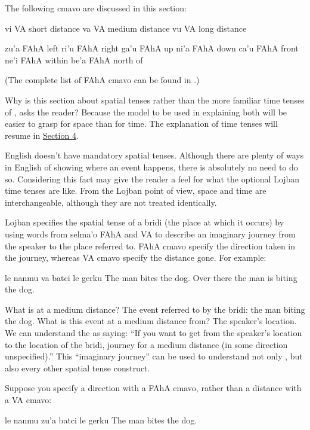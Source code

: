 The following cmavo are discussed in this section:

   vi  VA  short distance
    va  VA  medium distance
    vu  VA  long distance

zu'a    FAhA    left
    ri'u    FAhA    right
    ga'u    FAhA    up
    ni'a    FAhA    down
    ca'u    FAhA    front
    ne'i    FAhA    within
    be'a    FAhA    north of

(The complete list of FAhA cmavo can be found in .) 

Why is this section about spatial tenses rather than the
    more familiar time tenses of , asks
    the reader? Because the model to be used in explaining both
    will be easier to grasp for space than for time. The
    explanation of time tenses will resume in \hyperref[sec:10:4]{Section
    4}.

English doesn't have mandatory spatial tenses. Although
    there are plenty of ways in English of showing where an event
    happens, there is absolutely no need to do so. Considering this
    fact may give the reader a feel for what the optional Lojban
    time tenses are like. From the Lojban point of view, space and
    time are interchangeable, although they are not treated
    identically.

Lojban specifies the spatial tense of a bridi (the place at
    which it occurs) by using words from selma'o FAhA and VA to
    describe an imaginary journey from the speaker to the place
    referred to. FAhA cmavo specify the direction taken in the
    journey, whereas VA cmavo specify the distance gone. For
    example:
\begin{example}
le nanmu va batci le gerku\n
The man  bites the dog.\n
Over there the man is biting the dog.
\end{example}

What is at a medium distance? The event referred to by the
    bridi: the man biting the dog. What is this event at a medium
    distance from? The speaker's location. We can understand the
     as saying: ``If you want to get from the speaker's
    location to the location of the bridi, journey for a medium
    distance (in some direction unspecified).'' This ``imaginary
    journey'' can be used to understand not only , but also every other spatial
    tense construct. 

Suppose you specify a direction with a FAhA cmavo, rather
    than a distance with a VA cmavo:
\begin{example}
le nanmu zu'a batci le gerku\n
The man  bites the dog.
\end{example}

